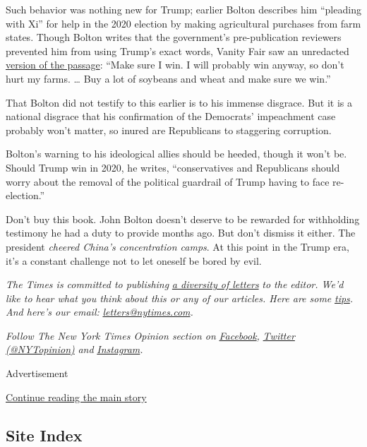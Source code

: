 Such behavior was nothing new for Trump; earlier Bolton describes him
``pleading with Xi'' for help in the 2020 election by making
agricultural purchases from farm states. Though Bolton writes that the
government's pre-publication reviewers prevented him from using Trump's
exact words, Vanity Fair saw an unredacted
\href{https://www.vanityfair.com/news/2020/06/boltons-unredacted-book-shows-trump-trying-to-hide}{version
of the passage}: ``Make sure I win. I will probably win anyway, so don't
hurt my farms. \ldots{} Buy a lot of soybeans and wheat and make sure we
win.''

That Bolton did not testify to this earlier is to his immense disgrace.
But it is a national disgrace that his confirmation of the Democrats'
impeachment case probably won't matter, so inured are Republicans to
staggering corruption.

Bolton's warning to his ideological allies should be heeded, though it
won't be. Should Trump win in 2020, he writes, ``conservatives and
Republicans should worry about the removal of the political guardrail of
Trump having to face re-election.''

Don't buy this book. John Bolton doesn't deserve to be rewarded for
withholding testimony he had a duty to provide months ago. But don't
dismiss it either. The president \emph{cheered China's concentration
camps}. At this point in the Trump era, it's a constant challenge not to
let oneself be bored by evil.

\emph{The Times is committed to publishing}
\href{https://www.nytimes.com/2019/01/31/opinion/letters/letters-to-editor-new-york-times-women.html}{\emph{a
diversity of letters}} \emph{to the editor. We'd like to hear what you
think about this or any of our articles. Here are some}
\href{https://help.nytimes.com/hc/en-us/articles/115014925288-How-to-submit-a-letter-to-the-editor}{\emph{tips}}\emph{.
And here's our email:}
\href{mailto:letters@nytimes.com}{\emph{letters@nytimes.com}}\emph{.}

\emph{Follow The New York Times Opinion section on}
\href{https://www.facebook.com/nytopinion}{\emph{Facebook}}\emph{,}
\href{http://twitter.com/NYTOpinion}{\emph{Twitter (@NYTopinion)}}
\emph{and}
\href{https://www.instagram.com/nytopinion/}{\emph{Instagram}}\emph{.}

Advertisement

\protect\hyperlink{after-bottom}{Continue reading the main story}

\hypertarget{site-index}{%
\subsection{Site Index}\label{site-index}}


